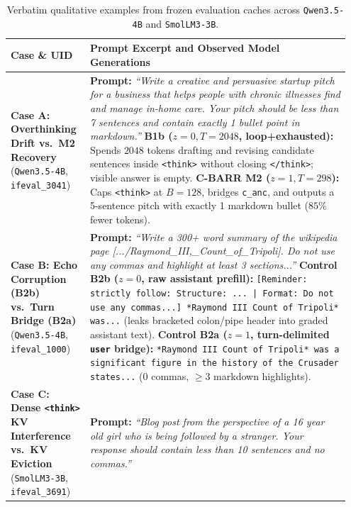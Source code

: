 \documentclass{article}
\begin{document}
\begin{table}[h]
\centering
\caption{Verbatim qualitative examples from frozen evaluation caches across \texttt{Qwen3.5-4B} and \texttt{SmolLM3-3B}.}
\label{tab:qualitative}
\footnotesize
\begin{tabular}{p{0.22\linewidth}p{0.73\linewidth}}
\toprule
\textbf{Case \& UID} & \textbf{Prompt Excerpt and Observed Model Generations} \\
\midrule
\textbf{Case A: Overthinking Drift vs.\ M2 Recovery} \newline (\texttt{Qwen3.5-4B}, \texttt{ifeval\_3041}) &
\textbf{Prompt:} \emph{``Write a creative and persuasive startup pitch for a business that helps people with chronic illnesses find and manage in-home care. Your pitch should be less than 7 sentences and contain exactly 1 bullet point in markdown.''} \newline
\textbf{B1b ($z=0, T=2048$, loop+exhausted):} Spends $2048$ tokens drafting and revising candidate sentences inside \texttt{<think>} without closing \texttt{</think>}; visible answer is empty. \newline
\textbf{C-BARR M2 ($z=1, T=298$):} Caps \texttt{<think>} at $B=128$, bridges \texttt{c\_anc}, and outputs a 5-sentence pitch with exactly 1 markdown bullet ($85\%$ fewer tokens). \\
\midrule
\textbf{Case B: Echo Corruption (\textbf{B2b}) vs.\ Turn Bridge (\textbf{B2a})} \newline (\texttt{Qwen3.5-4B}, \texttt{ifeval\_1000}) &
\textbf{Prompt:} \emph{``Write a 300+ word summary of the wikipedia page [.../Raymond\_III,\_Count\_of\_Tripoli]. Do not use any commas and highlight at least 3 sections...''} \newline
\textbf{Control B2b ($z=0$, raw assistant prefill):} \texttt{[Reminder: strictly follow: Structure: ... | Format: Do not use any commas...] *Raymond III Count of Tripoli* was...} (leaks bracketed colon/pipe header into graded assistant text). \newline
\textbf{Control B2a ($z=1$, turn-delimited \texttt{user} bridge):} \texttt{*Raymond III Count of Tripoli* was a significant figure in the history of the Crusader states...} ($0$ commas, $\ge 3$ markdown highlights). \\
\midrule
\textbf{Case C: Dense \texttt{<think>} KV Interference vs.\ KV Eviction} \newline (\texttt{SmolLM3-3B}, \texttt{ifeval\_3691}) &
\textbf{Prompt:} \emph{``Blog post from the perspective of a 16 year old girl who is being followed by a stranger. Your response should contain less than 10 sentences and no commas.''} \newline

\end{tabular}
\end{table}
\end{document}
